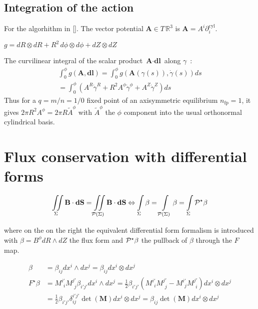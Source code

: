 \section{Integration of the action}

For the algorhithm in []. The vector potential $\textbf{A} \in T\,\mathbb{R}^3$ is $\textbf{A} =  A^i\partial_i^\text{cyl}$.

$g = dR\otimes dR + R^2\,d\phi\otimes d\phi + dZ\otimes dZ$

The curvilinear integral of the scalar product $\textbf{A}\cdot\textbf{dl}$ along $\gamma$~:
\begin{align*}
    \int_0^\phi g(\textbf{A},\textbf{dl}) = \int_0^\phi g(\textbf{A}(\gamma(s)),\dot{\gamma}(s))ds\\ = \int_0^\phi (A^R\dot{\gamma}^R + R^2A^\phi\dot{\gamma}^\phi + A^Z\dot{\gamma}^Z) ds
\end{align*}
Thus for a $q=m/n=1/0$ fixed point of an axisymmetric equilibrium $n_\text{fp} = 1$, it gives $2\pi R^2A^\phi = 2\pi R\tilde{A}^\phi$ with $\tilde{A}^\phi$ the $\phi$ component into the usual orthonormal cylindrical basis.

\chapter{Flux conservation with differential forms}\label{forms}

\begin{equation*}
    \iint\limits_{\Sigma}\textbf{B}\cdot\textbf{dS} = \iint\limits_{\mathcal{P}(\Sigma)}\textbf{B}\cdot\textbf{dS} \Leftrightarrow \int\limits_{\Sigma}\beta = \int\limits_{\mathcal{P}(\Sigma)}\beta = \int\limits_{\Sigma}\mathcal{P}^\star\beta
\end{equation*}

where on the on the right the equivalent differential form formalism is introduced with $\beta = B^\phi dR\wedge dZ$ the flux form and $\mathcal{P}^\star\beta$ the pullback of $\beta$ through the $F$ map.

\begin{align*}
    \beta &= \beta_{ij}dx^i\wedge dx^j = \beta_{ij}dx^i\otimes dx^j\\
    F^\star\beta &= M^{i'}_{\,\:i}M^{j'}_{\,\:j}\beta_{i'j'}dx^i\wedge dx^j = \frac{1}{2}\beta_{i'j'}\left(M^{i'}_{\,\:i}M^{j'}_{\,\:j}-M^{i'}_{\,\:j}M^{j'}_{\,\:i}\right)dx^i\otimes dx^j\\ &= \frac{1}{2}\beta_{i'j'}\delta^{i'j'}_{ij} \det(\textbf{M})dx^i\otimes dx^j = \beta_{ij}\det(\textbf{M})dx^i\otimes dx^j
\end{align*}

